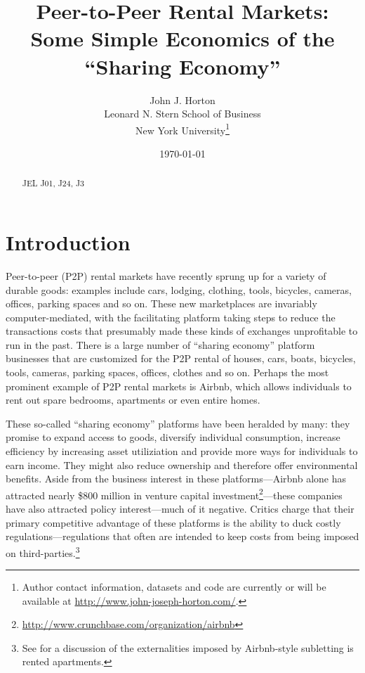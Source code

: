 \documentclass[11pt]{article}
\begin{document}
 

\title{Peer-to-Peer Rental Markets: \\ Some Simple Economics of the ``Sharing Economy''} 

\date{\today}

\author{John J. Horton \\ Leonard N. Stern School of Business \\ New York University\footnote{ Author contact information, datasets and code are currently or will be available at \href{http://www.john-joseph-horton.com/}{http://www.john-joseph-horton.com/}. } }
\maketitle

\begin{abstract}
\noindent  
\newline 
\noindent JEL J01, J24, J3
\end{abstract} 

\section{Introduction}
Peer-to-peer (P2P) rental markets have recently sprung up for a variety of durable goods:
examples include cars, lodging, clothing, tools, bicycles, cameras, offices, parking spaces and so on.
These new marketplaces are invariably computer-mediated, with the facilitating platform taking steps to reduce the transactions costs that presumably made these kinds of exchanges unprofitable to run in the past. 
There is a large number of ``sharing economy'' platform businesses that are customized for the P2P rental of houses, cars, boats, bicycles, tools, cameras, parking spaces, offices, clothes and so on. 
Perhaps the most prominent example of P2P rental markets is Airbnb, which allows individuals to rent out spare bedrooms, apartments or even entire homes. 

These so-called ``sharing economy'' platforms have been heralded by many: 
they promise to expand access to goods, diversify individual consumption, increase efficiency by increasing asset utiliziation and provide more ways for individuals to earn income.
They might also reduce ownership and therefore offer environmental benefits.  
Aside from the business interest in these platforms---Airbnb alone has attracted nearly \$800 million in venture capital investment\footnote{\href{http://www.crunchbase.com/organization/airbnb}{http://www.crunchbase.com/organization/airbnb}}---these companies have also attracted policy interest---much of it negative. 
Critics charge that their primary competitive advantage of these platforms is the ability to duck costly regulations---regulations that often are intended to keep costs from being imposed on third-parties.\footnote{See \cite{horton2014tragedy} for a discussion of the externalities imposed by Airbnb-style subletting is rented apartments.}   
\end{document}
